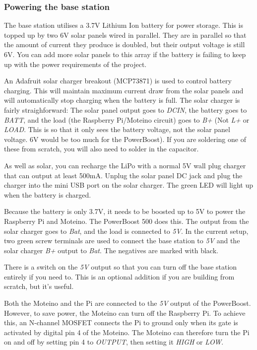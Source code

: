 \documentclass[10pt]{article}
\begin{document}
\subsubsection{Powering the base station}
The base station utilises a 3.7V Lithium Ion battery for power storage. This is topped up by two 6V solar panels wired in parallel. They are in parallel so that the amount of current they produce is doubled, but their output voltage is still 6V. You can add more solar panels to this array if the battery is failing to keep up with the power requirements of the project.

An Adafruit solar charger breakout (MCP73871) is used to control battery charging. This will maintain maximum current draw from the solar panels and will automatically stop charging when the battery is full. The solar charger is fairly straighforward: The solar panel output goes to \textit{DCIN}, the battery goes to \textit{BATT}, and the load (the Raspberry Pi/Moteino circuit) goes to \textit{B+} (Not \textit{L+} or \textit{LOAD}. This is so that it only sees the battery voltage, not the solar panel voltage. 6V would be too much for the PowerBoost). If you are soldering one of these from scratch, you will also need to solder in the capacitor.

As well as solar, you can recharge the LiPo with a normal 5V wall plug charger that can output at least 500mA. Unplug the solar panel DC jack and plug the charger into the mini USB port on the solar charger. The green LED will light up when the battery is charged. 

Because the battery is only 3.7V, it needs to be boosted up to 5V to power the Raspberry Pi and Moteino. The PowerBoost 500 does this. The output from the solar charger goes to \textit{Bat}, and the load is connected to \textit{5V}. In the current setup, two green screw terminals are used to connect the base station to \textit{5V} and the solar charger \textit{B+} output to \textit{Bat}. The negatives are marked with black.

There is a switch on the \textit{5V} output so that you can turn off the base station entirely if you need to. This is an optional addition if you are building from scratch, but it's useful.

Both the Moteino and the Pi are connected to the \textit{5V} output of the PowerBoost. However, to save power, the Moteino can turn off the Raspberry Pi. To achieve this, an N-channel MOSFET connects the Pi to ground only when its gate is activated by digital pin 4 of the Moteino. The Moteino can therefore turn the Pi on and off by setting pin 4 to \textit{OUTPUT}, then setting it \textit{HIGH} or \textit{LOW}.
\end{document}
